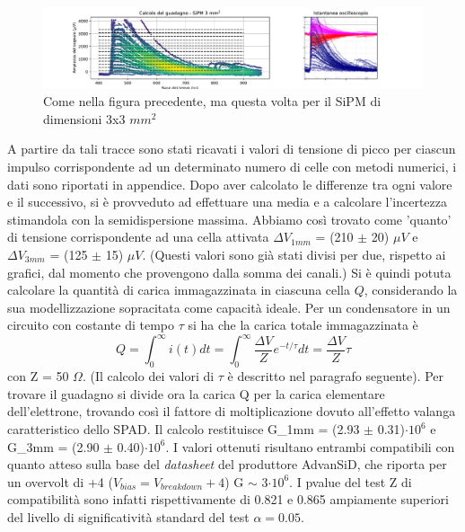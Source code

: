 \documentclass[journal]{IEEEtran}
\begin{document}
\begin{figure}[t]%
\centering
\begin{center}
\includegraphics[trim = {100pt 0 0 0}, width=1.15\textwidth]{analysis/output/SiPM_3mm_gain_staircase.pdf}
\end{center}
\caption{Come nella figura precedente, ma questa volta per il SiPM di dimensioni 3x3 $mm^2$}
\label{fig:staircase_3mm}
\end{figure}

A partire da tali tracce sono stati ricavati i valori di tensione di picco per ciascun impulso corrispondente ad un determinato numero di celle con metodi numerici, i dati sono riportati in appendice. Dopo aver calcolato le differenze tra ogni valore e il successivo, si è provveduto ad effettuare una media e a calcolare l'incertezza stimandola con la semidispersione massima. Abbiamo così trovato come 'quanto' di tensione corrispondente ad una cella attivata $\Delta V_{1mm}$ = (210 $\pm$ 20) $\mu V$ e  $\Delta V_{3mm}$ = (125 $\pm$ 15) $\mu V$. (Questi valori sono già stati divisi per due, rispetto ai grafici, dal momento che provengono dalla somma dei canali.) Si è quindi potuta calcolare la quantità di carica immagazzinata in ciascuna cella $Q$, considerando la sua modellizzazione sopracitata come capacità ideale. Per un condensatore in un circuito con costante di tempo $\tau$ si ha che la carica totale immagazzinata è
\begin{equation}
    Q = \int_{0}^{\infty} i(t) dt = \int_{0}^{\infty} \frac{\Delta V}{Z} e^{-t/ \tau}  dt = \frac{\Delta V}{Z} \tau
\end{equation}
con Z = 50 $\Omega$. (Il calcolo dei valori di $\tau$ è descritto nel paragrafo seguente). Per trovare il guadagno si divide ora la carica Q per la carica elementare dell'elettrone, trovando così il fattore di moltiplicazione dovuto all'effetto valanga caratteristico dello SPAD. Il calcolo restituisce G_{1mm} = (2.93 $\pm$ 0.31)$\cdot 10^6$ e G_{3mm} = (2.90 $\pm$ 0.40)$\cdot 10^6$. I valori ottenuti risultano entrambi compatibili con quanto atteso sulla base del \textit{datasheet} del produttore AdvanSiD, che riporta per un overvolt di +4 ($V_{bias} = V_{breakdown} + 4$) G $\sim$ 3$\cdot10^6$. I pvalue del test Z di compatibilità sono infatti rispettivamente di 0.821 e 0.865 ampiamente superiori del livello di significatività standard del test $\alpha = 0.05$.
\end{document}
